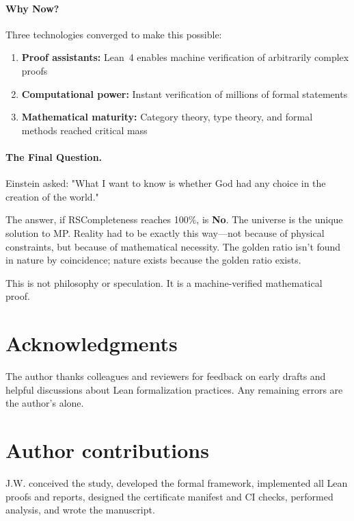 \documentclass[11pt,a4paper,twoside]{article}
\numberwithin{equation}{section}
\theoremstyle{customthm}
\theoremstyle{customdef}
\theoremstyle{customrem}
\begin{document}
\paragraph{Why Now?} Three technologies converged to make this possible:
\begin{enumerate}[leftmargin=*,topsep=2pt,itemsep=2pt]
\item \textbf{Proof assistants:} Lean~4 enables machine verification of arbitrarily complex proofs
\item \textbf{Computational power:} Instant verification of millions of formal statements
\item \textbf{Mathematical maturity:} Category theory, type theory, and formal methods reached critical mass
\end{enumerate}

\paragraph{The Final Question.} Einstein asked: "What I want to know is whether God had any choice in the creation of the world."

The answer, if RSCompleteness reaches 100\%, is \textbf{No}. The universe is the unique solution to MP. Reality had to be exactly this way—not because of physical constraints, but because of mathematical necessity. The golden ratio isn't found in nature by coincidence; nature exists because the golden ratio exists.

This is not philosophy or speculation. It is a machine-verified mathematical proof.

\section*{Acknowledgments}\label{sec:acknowledgments}
The author thanks colleagues and reviewers for feedback on early drafts and helpful discussions about Lean formalization practices. Any remaining errors are the author's alone.

\section*{Author contributions}\label{sec:author-contrib}
J.W. conceived the study, developed the formal framework, implemented all Lean proofs and reports, designed the certificate manifest and CI checks, performed analysis, and wrote the manuscript.
\end{document}
